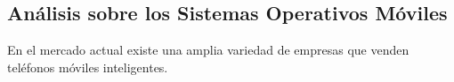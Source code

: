 \subsection{Análisis sobre los Sistemas Operativos Móviles}
\label{sistemas_operativos}

En el mercado actual existe una amplia variedad de empresas que venden
teléfonos móviles inteligentes.
